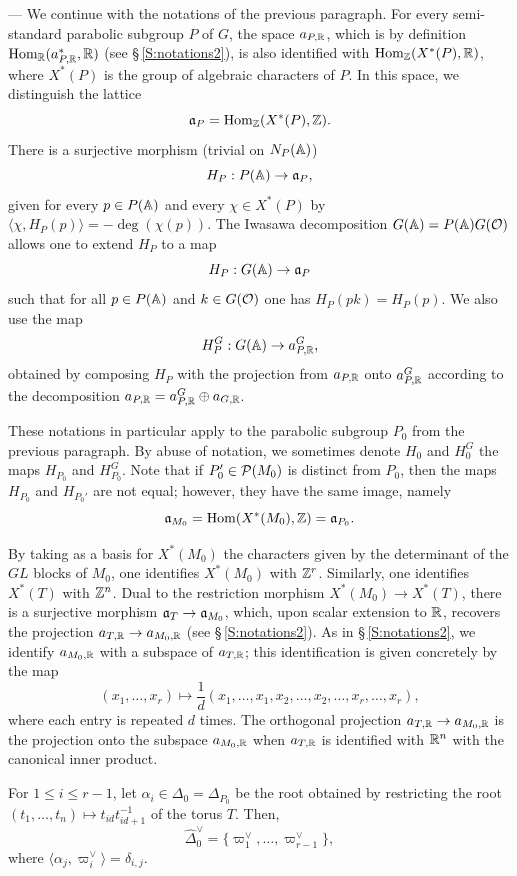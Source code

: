 \begin{paragr} ---\label{S:reseaux}
We continue with the notations of the previous paragraph. For every semi-standard parabolic subgroup $P$ of $G$, the space $a_{P,\mathbb{R}}$, which is by definition $\operatorname{Hom}_{\mathbb{R}}(a_{P,\mathbb{R}}^*,\mathbb{R})$ (see \S\,\ref{S:notations2}), is also identified with $\operatorname{Hom}_{\mathbb{Z}}(X^*(P),\mathbb{R})$, where $X^*(P)$ is the group of algebraic characters of $P$. In this space, we distinguish the lattice 
$$\mathfrak{a}_P=\operatorname{Hom}_{\mathbb{Z}}(X^*(P),\mathbb{Z}).$$
There is a surjective morphism (trivial on $N_P(\mathbb{A})$)
$$H_P : P(\mathbb{A}) \to \mathfrak{a}_P,$$
given for every $p\in P(\mathbb{A})$ and every $\chi\in X^*(P)$ by $\langle \chi, H_P(p)\rangle=-\deg(\chi(p))$. The Iwasawa decomposition $G(\mathbb{A})=P(\mathbb{A})G(\mathcal{O})$ allows one to extend $H_{P}$ to a map
$$H_P : G(\mathbb{A}) \to \mathfrak{a}_P$$
such that for all $p\in P(\mathbb{A})$ and $k\in G(\mathcal{O})$ one has $H_P(pk)=H_P(p)$.
We also use the map 
$$H_P^G : G(\mathbb{A})\to a_{P,\mathbb{R}}^G,$$
obtained by composing $H_P$ with the projection from $a_{P,\mathbb{R}}$ onto $a_{P,\mathbb{R}}^G$ according to the decomposition $a_{P,\mathbb{R}}=a_{P,\mathbb{R}}^G\oplus a_{G,\mathbb{R}}$.

These notations in particular apply to the parabolic subgroup $P_0$ from the previous paragraph. By abuse of notation, we sometimes denote $H_0$ and $H_0^G$ the maps $H_{P_0}$ and $H_{P_0}^G$. Note that if $P_0'\in \mathcal{P}(M_0)$ is distinct from $P_0$, then the maps $H_{P_0}$ and $H_{P_0'}$ are not equal; however, they have the same image, namely
$$\mathfrak{a}_{M_0}=\operatorname{Hom}(X^*(M_0),\mathbb{Z})=\mathfrak{a}_{P_0}.$$

By taking as a basis for $X^*(M_0)$ the characters given by the determinant of the $GL$ blocks of $M_0$, one identifies $X^*(M_0)$ with $\mathbb{Z}^r$. Similarly, one identifies $X^*(T)$ with $\mathbb{Z}^n$. Dual to the restriction morphism $X^*(M_0)\to X^*(T)$, there is a surjective morphism $\mathfrak{a}_T\to \mathfrak{a}_{M_0}$, which, upon scalar extension to $\mathbb{R}$, recovers the projection $a_{T,\mathbb{R}}\to a_{M_0,\mathbb{R}}$ (see \S\,\ref{S:notations2}). As in \S\,\ref{S:notations2}, we identify $a_{M_0,\mathbb{R}}$ with a subspace of $a_{T,\mathbb{R}}$; this identification is given concretely by the map
$$(x_1, \ldots, x_r) \mapsto \frac{1}{d}(x_1,\ldots,x_1,x_2,\ldots,x_2,\ldots, x_r,\ldots,x_r),$$
where each entry is repeated $d$ times. The orthogonal projection $a_{T,\mathbb{R}}\to a_{M_0,\mathbb{R}}$ is the projection onto the subspace $a_{M_0,\mathbb{R}}$ when $a_{T,\mathbb{R}}$ is identified with $\mathbb{R}^n$ with the canonical inner product.

For $1\leq i \leq r-1$, let $\alpha_i\in \Delta_0=\Delta_{P_0}$ be the root obtained by restricting the root $(t_1,\ldots,t_n)\mapsto t_{id}t_{id+1}^{-1}$ of the torus $T$. Then,
$$\hat{\Delta}_0^\vee=\{\varpi_1^\vee,\ldots, \varpi_{r-1}^\vee \},$$
where $\langle \alpha_j , \varpi_i^\vee\rangle=\delta_{i,j}$.


\end{paragr}
